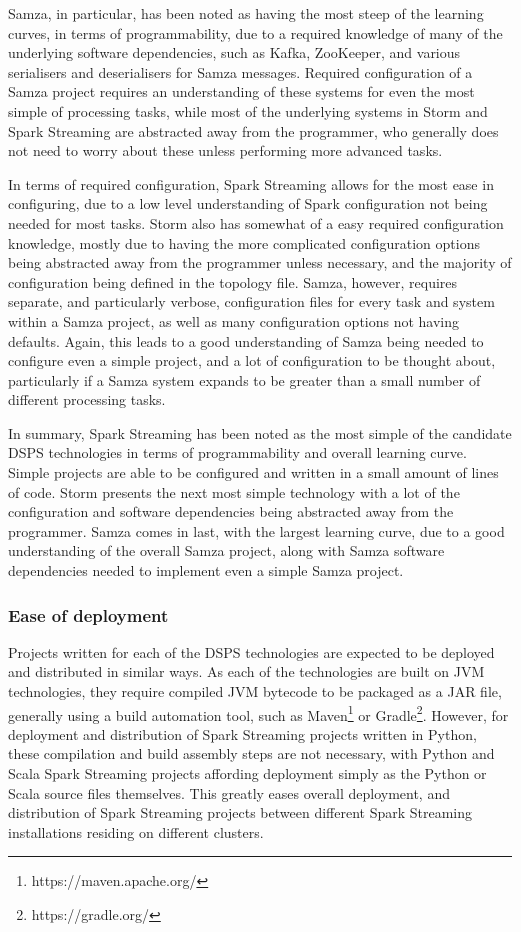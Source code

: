 Samza, in particular, has been noted as having the most steep of the learning curves, in terms of programmability, due
to a required knowledge of many of the underlying software dependencies, such as Kafka, ZooKeeper, and various serialisers
and deserialisers for Samza messages. Required configuration of a Samza project requires an understanding of these systems for
even the most simple of processing tasks, while most of the underlying systems in Storm and Spark Streaming are abstracted
away from the programmer, who generally does not need to worry about these unless performing more advanced tasks.

In terms of required configuration, Spark Streaming allows for the most ease in configuring, due to a low level understanding
of Spark configuration not being needed for most tasks. Storm also has somewhat of a easy required configuration knowledge,
mostly due to having the more complicated configuration options being abstracted away from the programmer unless necessary, and the
majority of configuration being defined in the topology file. Samza, however, requires separate, and particularly verbose,
configuration files for every task and system within a Samza project, as well as many configuration options not having
defaults. Again, this leads to a good understanding of Samza being needed to configure even a simple project, and a lot
of configuration to be thought about, particularly if a Samza system expands to be greater than a small number of different
processing tasks.

In summary, Spark Streaming has been noted as the most simple of the candidate DSPS technologies in terms of programmability
and overall learning curve. Simple projects are able to be configured and written in a small amount of lines of code.
Storm presents the next most simple technology with a lot of the configuration and software dependencies being abstracted
away from the programmer. Samza comes in last, with the largest learning curve, due to a good understanding of the overall
Samza project, along with Samza software dependencies needed to implement even a simple Samza project.


\subsubsection{Ease of deployment}

Projects written for each of the DSPS technologies are expected to be deployed and distributed in similar ways. As each
of the technologies are built on JVM technologies, they require compiled JVM bytecode to be packaged as a JAR file, generally
using a build automation tool, such as Maven\footnote{https://maven.apache.org/} or Gradle\footnote{https://gradle.org/}.
However, for deployment and distribution of Spark Streaming projects written in Python, these compilation and build
assembly steps are not necessary, with Python and Scala Spark Streaming projects affording deployment simply as the Python
or Scala source files themselves. This greatly eases overall deployment, and distribution of Spark Streaming projects between
different Spark Streaming installations residing on different clusters.

